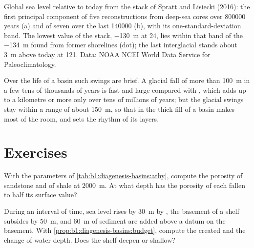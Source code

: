 \begin{omfigure}
{\small Global sea level relative to today from the stack of Spratt and
Lisiecki (2016): the first principal component of five reconstructions from
deep-sea cores over \num{800000} years (a) and of seven over the last
\num{140000} (b), with its one-standard-deviation band. The lowest value of the
stack, \qty{-130}{m} at \qty{24}{\ka}, lies within that band of the
\qty{-134}{m} found from former shorelines (dot); the last interglacial stands
about \qty{3}{m} above today at \qty{121}{\ka}. Data: NOAA NCEI World Data
Service for Paleoclimatology.}
\label{fig:b1:diagenesis-basins:sea-level}
\end{omfigure}

Over the life of a basin such swings are brief. A glacial fall of more than
\qty{100}{m} in a few tens of thousands of years is fast and large compared with
, which adds up to a kilometre or more only over tens of
millions of years; but the glacial swings stay within a range of about
\qty{150}{m}, so that in the thick fill of a basin  makes most of the
room, and  sets the rhythm of its layers.

\section{Exercises}

\begin{exercise}[$\star$]\label{exo:b1:diagenesis-basins:1}
With the parameters of \cref{tab:b1:diagenesis-basins:athy}, compute the
porosity of sandstone and of shale at \qty{2000}{m}. At what depth has the
porosity of each fallen to half its surface value?
\end{exercise}

\begin{exercise}[$\star$]\label{exo:b1:diagenesis-basins:2}
During an interval of time, sea level rises by \qty{30}{m} by , the
basement of a shelf subsides by \qty{50}{m}, and \qty{60}{m} of sediment are
added above a datum on the basement. With
\cref{prop:b1:diagenesis-basins:budget}, compute the  created and
the change of water depth. Does the shelf deepen or shallow?
\end{exercise}

